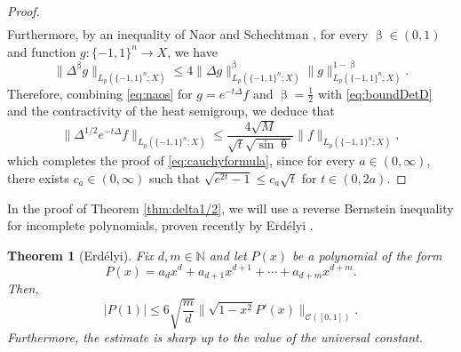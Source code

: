 \documentclass[11pt,reqno]{amsart}
\renewcommand{\leq}{\leqslant}
\newcommand{\1}{\mathbf 1}
\newtheorem{theorem}{Theorem}
\theoremstyle{remark}
\newcommand{\N}{\mathbb N}
\renewcommand{\theta}{\uptheta}
\renewcommand{\beta}{\upbeta}
\newcommand{\ms}{\mathscr}
\begin{document}
\begin{proof}
\begin{equation}
\begin{split}
\end{split}
\end{equation}
Furthermore, by an inequality of Naor and Schechtman \cite[Lemma~5.6]{BELP08}, for every $\beta\in(0,1)$ and function $g:\{-1,1\}^n\to X$, we have
\begin{equation} \label{eq:naos}
\|\Delta^{\beta}g\|_{L_p(\{-1,1\}^n;X)} \leq 4 \|\Delta g\|_{L_p(\{-1,1\}^n;X)}^{\beta}\|g\|_{L_p(\{-1,1\}^n;X)}^{1-\beta}.
\end{equation}
Therefore, combining \eqref{eq:naos} for $g=e^{-t\Delta}f$ and $\beta=\frac{1}{2}$ with \eqref{eq:boundDetD} and the contractivity of the heat semigroup, we deduce that
\begin{equation}
\|\Delta^{1/2} e^{-t\Delta} f\|_{L_p(\{-1,1\}^n;X)} \leq \frac{4\sqrt{M}}{\sqrt{t}\sqrt{\sin\theta}}\|f\|_{L_p(\{-1,1\}^n;X)},
\end{equation}
which completes the proof of \eqref{eq:cauchyformula}, since for every $a\in(0,\infty)$, there exists $c_a\in(0,\infty)$ such that $\sqrt{e^{2t}-1} \leq c_a \sqrt{t}$ for $t\in(0,2a)$.
\end{proof}

In the proof of Theorem \ref{thm:delta1/2}, we will use a reverse Bernstein inequality for incomplete polynomials, proven recently by Erd\'elyi \cite{Erd18}.

\begin{theorem} [Erd\'elyi] \label{thm:erd}
Fix $d,m\in\N$ and let $P(x)$ be a polynomial of the form 
\begin{equation}
P(x) = a_d x^d + a_{d+1}x^{d+1} +\cdots + a_{d+m} x^{d+m}.
\end{equation}
Then,
\begin{equation} \label{eq:erdelyi}
|P(1)| \leq 6 \sqrt{\frac{m}{d}} \|\sqrt{1-x^2}P'(x)\|_{\ms{C}([0,1])}.
\end{equation}
Furthermore, the estimate is sharp up to the value of the universal constant.
\end{theorem}
\end{document}
